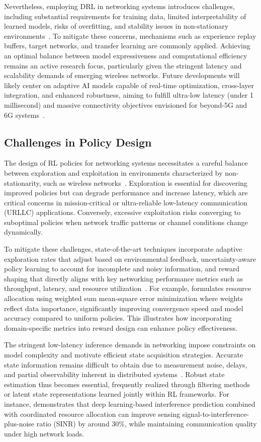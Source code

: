 \documentclass[sigconf]{acmart}
\begin{document}
Nevertheless, employing DRL in networking systems introduces challenges, including substantial requirements for training data, limited interpretability of learned models, risks of overfitting, and stability issues in non-stationary environments~\cite{ref13}. To mitigate these concerns, mechanisms such as experience replay buffers, target networks, and transfer learning are commonly applied. Achieving an optimal balance between model expressiveness and computational efficiency remains an active research focus, particularly given the stringent latency and scalability demands of emerging wireless networks. Future developments will likely center on adaptive AI models capable of real-time optimization, cross-layer integration, and enhanced robustness, aiming to fulfill ultra-low latency (under 1 millisecond) and massive connectivity objectives envisioned for beyond-5G and 6G systems~\cite{ref13,ref50}.

\subsection{Challenges in Policy Design}

The design of RL policies for networking systems necessitates a careful balance between exploration and exploitation in environments characterized by non-stationarity, such as wireless networks~\cite{ref3,ref6,ref14,ref48}. Exploration is essential for discovering improved policies but can degrade performance and increase latency, which are critical concerns in mission-critical or ultra-reliable low-latency communication (URLLC) applications. Conversely, excessive exploitation risks converging to suboptimal policies when network traffic patterns or channel conditions change dynamically.

To mitigate these challenges, state-of-the-art techniques incorporate adaptive exploration rates that adjust based on environmental feedback, uncertainty-aware policy learning to account for incomplete and noisy information, and reward shaping that directly aligns with key networking performance metrics such as throughput, latency, and resource utilization~\cite{ref3,ref6}. For example, \cite{ref3} formulates resource allocation using weighted sum mean-square error minimization where weights reflect data importance, significantly improving convergence speed and model accuracy compared to uniform policies. This illustrates how incorporating domain-specific metrics into reward design can enhance policy effectiveness.

The stringent low-latency inference demands in networking impose constraints on model complexity and motivate efficient state acquisition strategies. Accurate state information remains difficult to obtain due to measurement noise, delays, and partial observability inherent in distributed systems~\cite{ref3,ref48}. Robust state estimation thus becomes essential, frequently realized through filtering methods or latent state representations learned jointly within RL frameworks. For instance, \cite{ref48} demonstrates that deep learning-based interference prediction combined with coordinated resource allocation can improve sensing signal-to-interference-plus-noise ratio (SINR) by around 30\%, while maintaining communication quality under high network loads.
\end{document}
